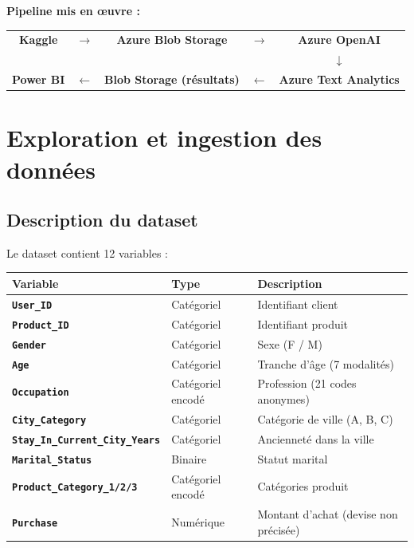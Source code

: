 \documentclass[12pt, a4paper]{article}
\newcommand{\mytexttt}[1]{\texttt{\textbf{\textcolor{colortt}{#1}}}}
\begin{document}
\medskip
\textbf{Pipeline mis en œuvre :}

\begin{center}
\begin{tabular}{ccccc}
  \textbf{Kaggle} & $\longrightarrow$ & \textbf{Azure Blob Storage} &
  $\longrightarrow$ & \textbf{Azure OpenAI} \\
  & & & & $\downarrow$ \\
  \textbf{Power BI} & $\longleftarrow$ & \textbf{Blob Storage (résultats)} &
  $\longleftarrow$ & \textbf{Azure Text Analytics} \\
\end{tabular}
\end{center}

\section{Exploration et ingestion des données}

\subsection{Description du dataset}

Le dataset contient 12 variables :

\begin{center}
\begin{tabular}{lll}
  \toprule
  \textbf{Variable} & \textbf{Type} & \textbf{Description} \\
  \midrule
  \mytexttt{User\_ID} & Catégoriel & Identifiant client \\
  \mytexttt{Product\_ID} & Catégoriel & Identifiant produit \\
  \mytexttt{Gender} & Catégoriel & Sexe (F / M) \\
  \mytexttt{Age} & Catégoriel & Tranche d'âge (7 modalités) \\
  \mytexttt{Occupation} & Catégoriel encodé & Profession (21 codes anonymes) \\
  \mytexttt{City\_Category} & Catégoriel & Catégorie de ville (A, B, C) \\
  \mytexttt{Stay\_In\_Current\_City\_Years} & Catégoriel & Ancienneté dans la ville \\
  \mytexttt{Marital\_Status} & Binaire & Statut marital \\
  \mytexttt{Product\_Category\_1/2/3} & Catégoriel encodé & Catégories produit \\
  \mytexttt{Purchase} & Numérique & Montant d'achat (devise non précisée) \\
  \bottomrule
\end{tabular}
\end{center}
\end{document}
